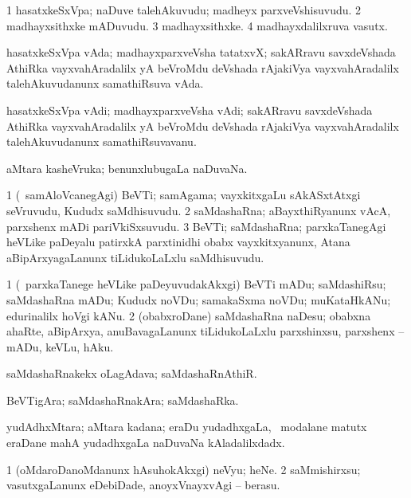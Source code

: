 \bentry
{}
\gl{\nA}
\bmng
\bnum
\num{1} hasatxkeSxVpa; naDuve talehAkuvudu; madheyx parxveVshisuvudu. 
\num{2} madhayxsithxke mADuvudu. 
\num{3} madhayxsithxke. 
\num{4} madhayxdalilxruva vasutx. 
\enum
\emng
\eentry

\bentry
{}
\gl{\nA}
\bmng
hasatxkeSxVpa vAda; madhayxparxveVsha tatatxvX; sakARravu savxdeVshada AthiRka vayxvahAradalilx yA beVroMdu deVshada rAjakiVya vayxvahAradalilx talehAkuvudanunx samathiRsuva vAda. 
\emng
\eentry

\bentry
{}
\gl{\nA}
\bmng
hasatxkeSxVpa vAdi; madhayxparxveVsha vAdi; sakARravu savxdeVshada AthiRka vayxvahAradalilx yA beVroMdu deVshada rAjakiVya vayxvahAradalilx talehAkuvudanunx samathiRsuvavanu. 
\emng
\eentry

\bentry
{}
\gl{\gu}
\bmng
aMtara kasheVruka; benunxlubugaLa naDuvaNa. 
\emng
\eentry

\bentry
{}
\gl{\nA}
\bmng
\bnum
\num{1} (\kanmu\ samAloVcanegAgi) BeVTi; samAgama; vayxkitxgaLu sAkASxtAtxgi seVruvudu, Kududx saMdhisuvudu. 
\num{2} saMdashaRna; aBayxthiRyanunx vAcA, parxshenx mADi pariVkiSxsuvudu. 
\num{3} BeVTi; saMdashaRna; parxkaTanegAgi heVLike paDeyalu patirxkA parxtinidhi obabx vayxkitxyanunx, Atana aBipArxyagaLanunx tiLidukoLaLxlu saMdhisuvudu. 
\enum
\emng
\eentry

\bentry
{}
\gl{\sakirx}
\bmng
\bnum
\num{1} (\kanmu\ parxkaTanege heVLike paDeyuvudakAkxgi) BeVTi mADu; saMdashiRsu; saMdashaRna mADu; Kududx noVDu; samakaSxma noVDu; muKataHkANu; edurinalilx hoVgi kANu. 
\num{2} (obabxroDane) saMdashaRna naDesu; obabxna ahaRte, aBipArxya, anuBavagaLanunx tiLidukoLaLxlu parxshinxsu, parxshenx -- mADu, keVLu, hAku. 
\enum
\emng
\eentry

\bentry
{}
\gl{\nA}
\bmng
saMdashaRnakekx oLagAdava; saMdashaRnAthiR. 
\emng
\eentry

\bentry
{}
\gl{\nA}
\bmng
BeVTigAra; saMdashaRnakAra; saMdashaRka. 
\emng
\eentry

\bentry
{}
\gl{\gu}
\bmng
yudAdhxMtara; aMtara kadana; eraDu yudadhxgaLa, \kanmu\ modalane matutx eraDane mahA yudadhxgaLa naDuvaNa kAladalilxdadx. 
\emng
\eentry

\bentry
{}
\gl{\sakirx}
\bmng
\bnum
\num{1} (oMdaroDanoMdanunx hAsuhokAkxgi) neVyu; heNe. 
\num{2} saMmishirxsu; vasutxgaLanunx eDebiDade, anoyxVnayxvAgi -- berasu. 
\enum
\emng
\eentry


